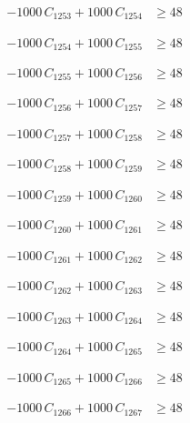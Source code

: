 \documentclass[a4paper,11pt]{article}
\begin{document}
\begin{align}
-1000\,C_{1253} + 1000\,C_{1254} &\geq 48 \nonumber
\end{align}

\begin{align}
-1000\,C_{1254} + 1000\,C_{1255} &\geq 48 \nonumber
\end{align}

\begin{align}
-1000\,C_{1255} + 1000\,C_{1256} &\geq 48 \nonumber
\end{align}

\begin{align}
-1000\,C_{1256} + 1000\,C_{1257} &\geq 48 \nonumber
\end{align}

\begin{align}
-1000\,C_{1257} + 1000\,C_{1258} &\geq 48 \nonumber
\end{align}

\begin{align}
-1000\,C_{1258} + 1000\,C_{1259} &\geq 48 \nonumber
\end{align}

\begin{align}
-1000\,C_{1259} + 1000\,C_{1260} &\geq 48 \nonumber
\end{align}

\begin{align}
-1000\,C_{1260} + 1000\,C_{1261} &\geq 48 \nonumber
\end{align}

\begin{align}
-1000\,C_{1261} + 1000\,C_{1262} &\geq 48 \nonumber
\end{align}

\begin{align}
-1000\,C_{1262} + 1000\,C_{1263} &\geq 48 \nonumber
\end{align}

\begin{align}
-1000\,C_{1263} + 1000\,C_{1264} &\geq 48 \nonumber
\end{align}

\begin{align}
-1000\,C_{1264} + 1000\,C_{1265} &\geq 48 \nonumber
\end{align}

\begin{align}
-1000\,C_{1265} + 1000\,C_{1266} &\geq 48 \nonumber
\end{align}

\begin{align}
-1000\,C_{1266} + 1000\,C_{1267} &\geq 48 \nonumber
\end{align}
\end{document}

